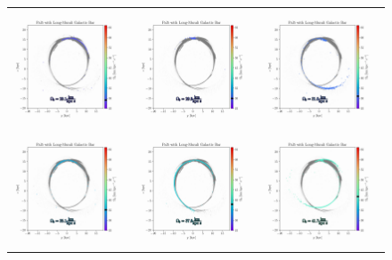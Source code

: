\begin{figure}
\begin{tabular}{ccc}
                \includegraphics[width=.32\linewidth]{images/frame_0016.png}&
                \includegraphics[width=.32\linewidth]{images/frame_0019.png}&
                \includegraphics[width=.32\linewidth]{images/frame_0023.png}\\
                
                \includegraphics[width=.32\linewidth]{images/frame_0038.png}&
                \includegraphics[width=.32\linewidth]{images/frame_0048.png}&
                \includegraphics[width=.32\linewidth]{images/frame_0062.png}\\


\end{tabular}
\end{figure}
